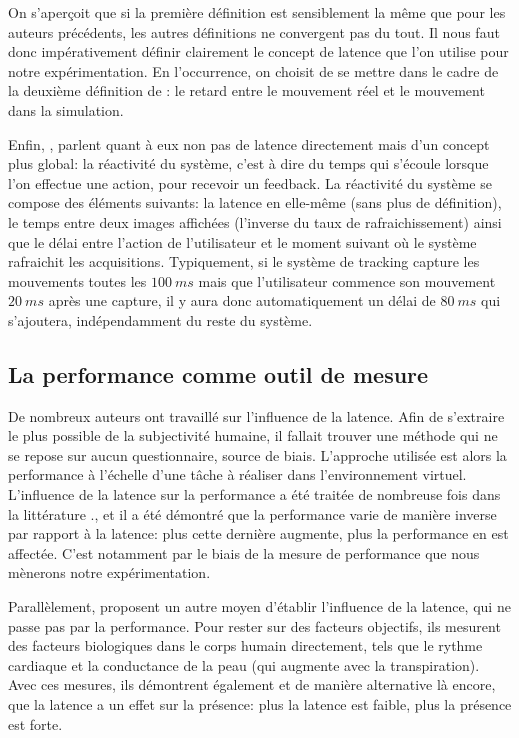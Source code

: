 	\par On s'aperçoit que si la première définition est sensiblement la même que pour les auteurs précédents, les autres définitions ne convergent pas du tout. Il nous faut donc impérativement définir clairement le concept de latence que l'on utilise pour notre expérimentation. En l'occurrence, on choisit de se mettre dans le cadre de la deuxième définition de \cite{hale_handbook_2015}: le retard entre le mouvement réel et le mouvement dans la simulation.
	
	\par Enfin, \cite{watson_effects_1998}, parlent quant à eux non pas de latence directement mais d'un concept plus global: la réactivité du système, c'est à dire du temps qui s'écoule lorsque l'on effectue une action, pour recevoir un feedback. La réactivité du système se compose des éléments suivants: la latence en elle-même (sans plus de définition), le temps entre deux images affichées (l'inverse du taux de rafraichissement) ainsi que le délai entre l'action de l'utilisateur et le moment suivant où le système rafraichit les acquisitions. Typiquement, si le système de tracking capture les mouvements toutes les $100~ms$ mais que l'utilisateur commence son mouvement $20~ms$ après une capture, il y aura donc automatiquement un délai de $80~ms$ qui s'ajoutera, indépendamment du reste du système.
	
	\subsection{La performance comme outil de mesure}
	\par De nombreux auteurs ont travaillé sur l'influence de la latence. Afin de s'extraire le plus possible de la subjectivité humaine, il fallait trouver une méthode qui ne se repose sur aucun questionnaire, source de biais. L'approche utilisée est alors la performance à l'échelle d'une tâche à réaliser dans l'environnement virtuel. L'influence de la latence sur la performance a été traitée de nombreuse fois dans la littérature \citep{ellis_sensor_1999,mania_perceptual_2004,watson_effects_1998,papadakis_system_2011,meehan_effect_2003}., et il a été démontré que la performance varie de manière inverse par rapport à la latence: plus cette dernière augmente, plus la performance en est affectée. C'est notamment par le biais de la mesure de performance que nous mènerons notre expérimentation.
	
	\par Parallèlement, \citep{meehan_effect_2003} proposent un autre moyen d'établir l'influence de la latence, qui ne passe pas par la performance. Pour rester sur des facteurs objectifs, ils mesurent des facteurs biologiques dans le corps humain directement, tels que le rythme cardiaque et la conductance de la peau (qui augmente avec la transpiration). Avec ces mesures, ils démontrent également et de manière alternative là encore, que la latence a un effet sur la présence: plus la latence est faible, plus la présence est forte.
	
